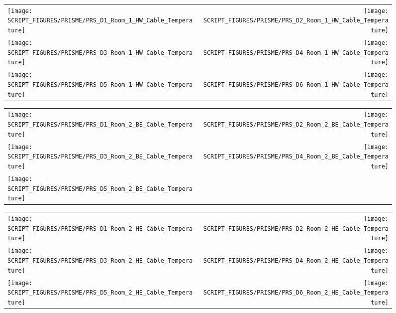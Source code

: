 \begin{figure}[p]
\begin{tabular*}{\textwidth}{l@{\extracolsep{\fill}}r}
\texttt{[image: SCRIPT\_FIGURES/PRISME/PRS\_D1\_Room\_1\_HW\_Cable\_Temperature]} &
\texttt{[image: SCRIPT\_FIGURES/PRISME/PRS\_D2\_Room\_1\_HW\_Cable\_Temperature]} \\
\texttt{[image: SCRIPT\_FIGURES/PRISME/PRS\_D3\_Room\_1\_HW\_Cable\_Temperature]} &
\texttt{[image: SCRIPT\_FIGURES/PRISME/PRS\_D4\_Room\_1\_HW\_Cable\_Temperature]} \\
\texttt{[image: SCRIPT\_FIGURES/PRISME/PRS\_D5\_Room\_1\_HW\_Cable\_Temperature]} &
\texttt{[image: SCRIPT\_FIGURES/PRISME/PRS\_D6\_Room\_1\_HW\_Cable\_Temperature]}
\end{tabular*}
\label{PRISME_HW_Cable_Room_1}
\end{figure}

\begin{figure}[p]
\begin{tabular*}{\textwidth}{l@{\extracolsep{\fill}}r}
\texttt{[image: SCRIPT\_FIGURES/PRISME/PRS\_D1\_Room\_2\_BE\_Cable\_Temperature]} &
\texttt{[image: SCRIPT\_FIGURES/PRISME/PRS\_D2\_Room\_2\_BE\_Cable\_Temperature]} \\
\texttt{[image: SCRIPT\_FIGURES/PRISME/PRS\_D3\_Room\_2\_BE\_Cable\_Temperature]} &
\texttt{[image: SCRIPT\_FIGURES/PRISME/PRS\_D4\_Room\_2\_BE\_Cable\_Temperature]} \\
\texttt{[image: SCRIPT\_FIGURES/PRISME/PRS\_D5\_Room\_2\_BE\_Cable\_Temperature]} &

\end{tabular*}
\label{PRISME_BE_Cable_Room_2}
\end{figure}

\begin{figure}[p]
\begin{tabular*}{\textwidth}{l@{\extracolsep{\fill}}r}
\texttt{[image: SCRIPT\_FIGURES/PRISME/PRS\_D1\_Room\_2\_HE\_Cable\_Temperature]} &
\texttt{[image: SCRIPT\_FIGURES/PRISME/PRS\_D2\_Room\_2\_HE\_Cable\_Temperature]} \\
\texttt{[image: SCRIPT\_FIGURES/PRISME/PRS\_D3\_Room\_2\_HE\_Cable\_Temperature]} &
\texttt{[image: SCRIPT\_FIGURES/PRISME/PRS\_D4\_Room\_2\_HE\_Cable\_Temperature]} \\
\texttt{[image: SCRIPT\_FIGURES/PRISME/PRS\_D5\_Room\_2\_HE\_Cable\_Temperature]} &
\texttt{[image: SCRIPT\_FIGURES/PRISME/PRS\_D6\_Room\_2\_HE\_Cable\_Temperature]}
\end{tabular*}
\label{PRISME_HE_Cable_Room_2}
\end{figure}

